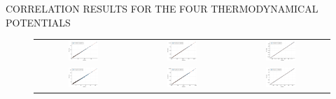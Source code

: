 CORRELATION RESULTS FOR THE FOUR THERMODYNAMICAL POTENTIALS

\begin{figure}[hbtp]
	\centering
	\begin{tabular}{ccc}
		\includegraphics[width=0.33\textwidth]{Figures/PotentialStudy/Psi_P_CorrelationTest} &
		\includegraphics[width=0.33\textwidth]{Figures/PotentialStudy/Psi_E0_CorrelationTest} &
		\includegraphics[width=0.33\textwidth]{Figures/PotentialStudy/Psi_theta_CorrelationTest} \\
		\includegraphics[width=0.33\textwidth]{Figures/PotentialStudy/e_P_CorrelationTest} &
\includegraphics[width=0.33\textwidth]{Figures/PotentialStudy/e_E0_CorrelationTest} &
\includegraphics[width=0.33\textwidth]{Figures/PotentialStudy/e_theta_CorrelationTest} \\		%

\end{tabular}
\end{figure}

